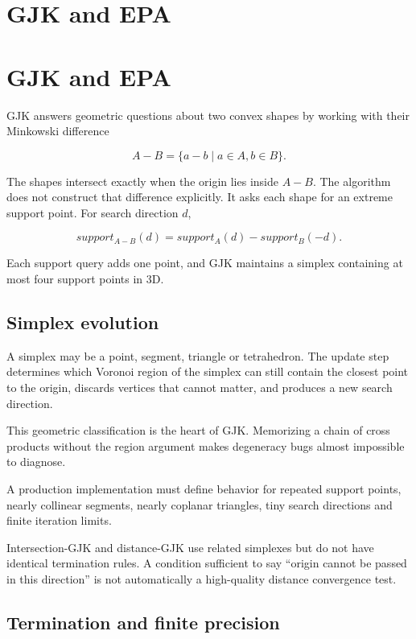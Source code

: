 \hypertarget{appendix-aef6177f7b3f}{}
\section*{GJK and EPA}
\section{GJK and EPA}\label{gjk-and-epa}

GJK answers geometric questions about two convex shapes by working with their Minkowski difference

\[
A-B=\{a-b\mid a\in A,b\in B\}.
\]

The shapes intersect exactly when the origin lies inside \(A-B\). The algorithm does not construct that difference explicitly. It asks each shape for an extreme support point. For search direction \(d\),

\[
support_{A-B}(d)=support_A(d)-support_B(-d).
\]

Each support query adds one point, and GJK maintains a simplex containing at most four support points in 3D.

\subsection{Simplex evolution}\label{simplex-evolution}

A simplex may be a point, segment, triangle or tetrahedron. The update step determines which Voronoi region of the simplex can still contain the closest point to the origin, discards vertices that cannot matter, and produces a new search direction.

This geometric classification is the heart of GJK. Memorizing a chain of cross products without the region argument makes degeneracy bugs almost impossible to diagnose.

A production implementation must define behavior for repeated support points, nearly collinear segments, nearly coplanar triangles, tiny search directions and finite iteration limits.

Intersection-GJK and distance-GJK use related simplexes but do not have identical termination rules. A condition sufficient to say ``origin cannot be passed in this direction'' is not automatically a high-quality distance convergence test.

\subsection{Termination and finite precision}\label{termination-and-finite-precision}

